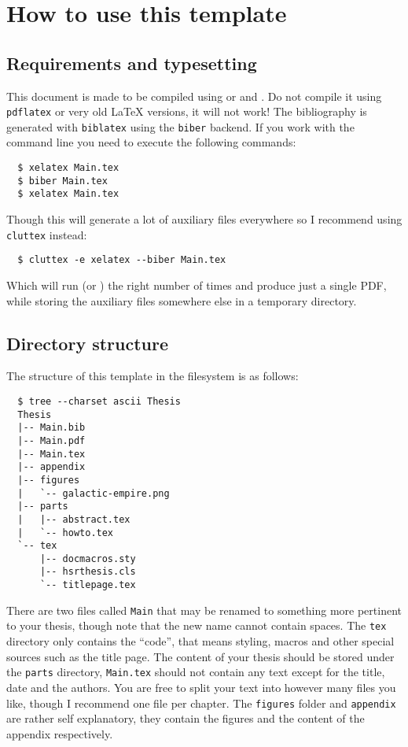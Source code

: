 
\chapter{How to use this template}


\section{Requirements and typesetting}

This document is made to be compiled using \XeLaTeX{} or \LuaLaTeX{} and
\LaTeXe. Do not compile it using \texttt{pdflatex} or very old \LaTeX
versions, it will not work! The bibliography is generated with
\texttt{biblatex} using the \texttt{biber} backend. If you work with the
command line you need to execute the following commands:
\begin{verbatim}
  $ xelatex Main.tex
  $ biber Main.tex
  $ xelatex Main.tex
\end{verbatim}
Though this will generate a lot of auxiliary files everywhere so I recommend
using \texttt{cluttex} instead:
\begin{verbatim}
  $ cluttex -e xelatex --biber Main.tex
\end{verbatim}
Which will run \XeLaTeX{} (or \LuaLaTeX{}) the right number of times and
produce just a single PDF, while storing the auxiliary files somewhere else in
a temporary directory.

\section{Directory structure}

The structure of this template in the filesystem is as follows:
\begin{verbatim}
  $ tree --charset ascii Thesis
  Thesis
  |-- Main.bib
  |-- Main.pdf
  |-- Main.tex
  |-- appendix
  |-- figures
  |   `-- galactic-empire.png
  |-- parts
  |   |-- abstract.tex
  |   `-- howto.tex
  `-- tex
      |-- docmacros.sty
      |-- hsrthesis.cls
      `-- titlepage.tex
\end{verbatim}
There are two files called \texttt{Main} that may be renamed to something more
pertinent to your thesis, though note that the new name cannot contain spaces.
The \texttt{tex} directory only contains the ``code'', that means styling,
macros and other special sources such as the title page.  The content of your
thesis should be stored under the \texttt{parts} directory, \texttt{Main.tex}
should not contain any text except for the title, date and the authors.  You
are free to split your text into however many files you like, though I
recommend one file per chapter.  The \texttt{figures} folder and
\texttt{appendix} are rather self explanatory, they contain the figures and
the content of the appendix respectively.

